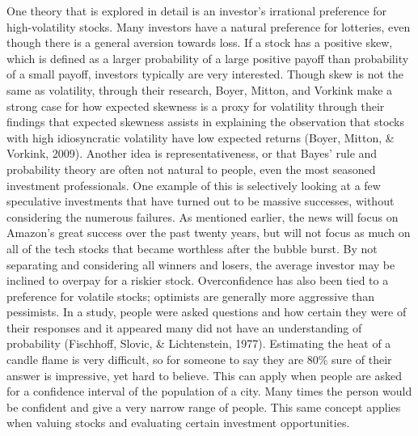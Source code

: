 \documentclass[12pt,twoside]{reedthesis}
\theoremstyle{definition}
\theoremstyle{definition}
\theoremstyle{definition}
\theoremstyle{remark}
\begin{document}
One theory that is explored in detail is an investor's irrational
preference for high-volatility stocks. Many investors have a natural
preference for lotteries, even though there is a general aversion
towards loss. If a stock has a positive skew, which is defined as a
larger probability of a large positive payoff than probability of a
small payoff, investors typically are very interested. Though skew is
not the same as volatility, through their research, Boyer, Mitton, and
Vorkink make a strong case for how expected skewness is a proxy for
volatility through their findings that expected skewness assists in
explaining the observation that stocks with high idiosyncratic
volatility have low expected returns (Boyer, Mitton, \& Vorkink, 2009).
Another idea is representativeness, or that Bayes' rule and probability
theory are often not natural to people, even the most seasoned
investment professionals. One example of this is selectively looking at
a few speculative investments that have turned out to be massive
successes, without considering the numerous failures. As mentioned
earlier, the news will focus on Amazon's great success over the past
twenty years, but will not focus as much on all of the tech stocks that
became worthless after the bubble burst. By not separating and
considering all winners and losers, the average investor may be inclined
to overpay for a riskier stock. Overconfidence has also been tied to a
preference for volatile stocks; optimists are generally more aggressive
than pessimists. In a study, people were asked questions and how certain
they were of their responses and it appeared many did not have an
understanding of probability (Fischhoff, Slovic, \& Lichtenstein, 1977).
Estimating the heat of a candle flame is very difficult, so for someone
to say they are 80\% sure of their answer is impressive, yet hard to
believe. This can apply when people are asked for a confidence interval
of the population of a city. Many times the person would be confident
and give a very narrow range of people. This same concept applies when
valuing stocks and evaluating certain investment opportunities.
\end{document}
